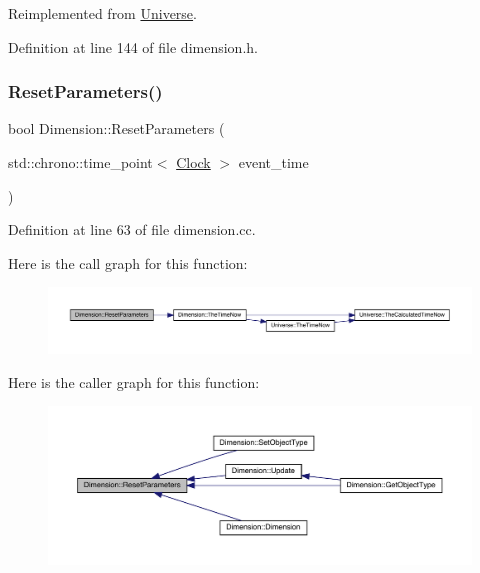 Reimplemented from \hyperlink{class_universe_a0c485c504542409cbb5cfd8543c35b11}{Universe}.



Definition at line 144 of file dimension.\+h.

\mbox{\label{class_dimension_af83732dba929ae01aca457e7d6121374}} 
\subsubsection{\texorpdfstring{Reset\+Parameters()}{ResetParameters()}}
{\footnotesize\ttfamily bool Dimension\+::\+Reset\+Parameters (\begin{DoxyParamCaption}\item[{std\+::chrono\+::time\+\_\+point$<$ \hyperlink{universe_8h_a0ef8d951d1ca5ab3cfaf7ab4c7a6fd80}{Clock} $>$}]{event\+\_\+time }\end{DoxyParamCaption})}



Definition at line 63 of file dimension.\+cc.

Here is the call graph for this function\+:
\nopagebreak
\begin{figure}[H]
\begin{center}
\leavevmode
\includegraphics[width=350pt]{class_dimension_af83732dba929ae01aca457e7d6121374_cgraph}
\end{center}
\end{figure}
Here is the caller graph for this function\+:
\nopagebreak
\begin{figure}[H]
\begin{center}
\leavevmode
\includegraphics[width=350pt]{class_dimension_af83732dba929ae01aca457e7d6121374_icgraph}
\end{center}
\end{figure}
\mbox{\label{class_dimension_a6d3f7fa4a26b92d8ae6161a1b8bb8220}} 

